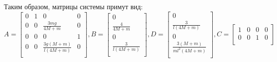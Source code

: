 Таким образом, матрицы системы примут вид: 
\begin{equation}
    A = \begin{bmatrix}
        0 & 1 & 0 & 0 \\
        0 & 0 & \frac{3mg}{4M + m} & 0 \\
        0 & 0 & 0 & 1 \\
        0 & 0 & \frac{3g(M + m)}{l(4M + m)} & 0 \\
    \end{bmatrix}, B = \begin{bmatrix}
        0 \\
        \frac{4}{4M + m} \\
        0 \\
        \frac{3}{l(4M + m)} \\
    \end{bmatrix}, D = \begin{bmatrix}
        0 \\
        \frac{3}{l(4M + m)} \\
        0 \\
        \frac{3(M + m)}{ml^2(4M + m)} \\
    \end{bmatrix}, C = \begin{bmatrix}
        1 & 0 & 0 & 0 \\
        0 & 0 & 1 & 0 \\ 
    \end{bmatrix}
\end{equation}
